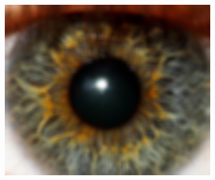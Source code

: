 \documentclass{article}
\begin{document}
\begin{figure}[H]
\begin{subfigure}{.09\textwidth}
  \label{fig:arrow}
\end{subfigure}%
\begin{subfigure}{.47\textwidth}
  \centering
  \includegraphics[width=0.97\linewidth]{_Figures/raw_data_3_blur.png}
  \caption{}
  \label{fig:raw_3_blur}
\end{subfigure}



\end{figure}
\end{document}

